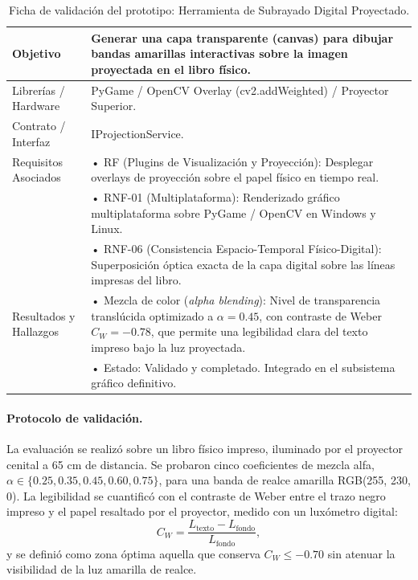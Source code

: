 \begin{table}[H]
    \centering
    \caption{Ficha de validación del prototipo: Herramienta de Subrayado Digital Proyectado.}
    \label{tab:ficha_f27}
    \begin{tabular}{L{3.2cm} L{11.0cm}}
        \toprule
        Objetivo & Generar una capa transparente (canvas) para dibujar bandas amarillas interactivas sobre la imagen proyectada en el libro físico. \\ \midrule
        Librerías / Hardware & PyGame / OpenCV Overlay (cv2.addWeighted) / Proyector Superior. \\ \midrule
        Contrato / Interfaz & IProjectionService. \\ \midrule
        Requisitos Asociados &
        • RF (Plugins de Visualización y Proyección): Desplegar overlays de proyección sobre el papel físico en tiempo real. \vspace{0.1cm} \\
        & • RNF-01 (Multiplataforma): Renderizado gráfico multiplataforma sobre PyGame / OpenCV en Windows y Linux. \vspace{0.1cm} \\
        & • RNF-06 (Consistencia Espacio-Temporal Físico-Digital): Superposición óptica exacta de la capa digital sobre las líneas impresas del libro. \\ \midrule
        Resultados y Hallazgos &
        • Mezcla de color (\textit{alpha blending}): Nivel de transparencia translúcida optimizado a $\alpha=0.45$, con contraste de Weber $C_W=-0.78$, que permite una legibilidad clara del texto impreso bajo la luz proyectada. \vspace{0.1cm} \\
        & • Estado: Validado y completado. Integrado en el subsistema gráfico definitivo. \\ \bottomrule
    \end{tabular}
\end{table}
 
\paragraph{Protocolo de validación.} La evaluación se realizó sobre un libro físico impreso, iluminado por el proyector cenital a 65 cm de distancia. Se probaron cinco coeficientes de mezcla alfa, $\alpha \in \{0.25, 0.35, 0.45, 0.60, 0.75\}$, para una banda de realce amarilla RGB(255, 230, 0). La legibilidad se cuantificó con el contraste de Weber entre el trazo negro impreso y el papel resaltado por el proyector, medido con un luxómetro digital:
\[ C_W = \frac{L_{\mathrm{texto}} - L_{\mathrm{fondo}}}{L_{\mathrm{fondo}}}, \]
y se definió como zona óptima aquella que conserva $C_W \le -0.70$ sin atenuar la visibilidad de la luz amarilla de realce.
 
